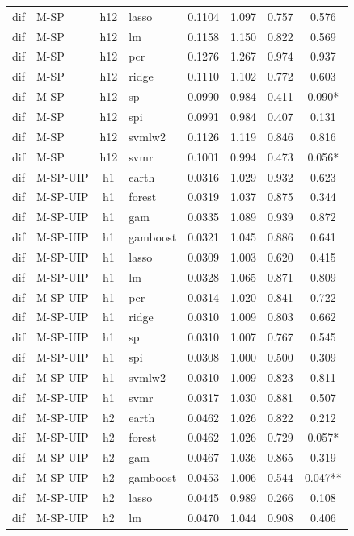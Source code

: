\begin{ThreePartTable}
\begin{longtable}[t]{llclcccc}
dif & M-SP & h12 & lasso & 0.1104 & 1.097 & 0.757 & 0.576\\
dif & M-SP & h12 & lm & 0.1158 & 1.150 & 0.822 & 0.569\\
dif & M-SP & h12 & pcr & 0.1276 & 1.267 & 0.974 & 0.937\\
dif & M-SP & h12 & ridge & 0.1110 & 1.102 & 0.772 & 0.603\\
dif & M-SP & h12 & sp & 0.0990 & 0.984 & 0.411 & 0.090*\\
dif & M-SP & h12 & spi & 0.0991 & 0.984 & 0.407 & 0.131\\
dif & M-SP & h12 & svmlw2 & 0.1126 & 1.119 & 0.846 & 0.816\\
dif & M-SP & h12 & svmr & 0.1001 & 0.994 & 0.473 & 0.056*\\
\addlinespace
dif & M-SP-UIP & h1 & earth & 0.0316 & 1.029 & 0.932 & 0.623\\
dif & M-SP-UIP & h1 & forest & 0.0319 & 1.037 & 0.875 & 0.344\\
dif & M-SP-UIP & h1 & gam & 0.0335 & 1.089 & 0.939 & 0.872\\
dif & M-SP-UIP & h1 & gamboost & 0.0321 & 1.045 & 0.886 & 0.641\\
dif & M-SP-UIP & h1 & lasso & 0.0309 & 1.003 & 0.620 & 0.415\\
dif & M-SP-UIP & h1 & lm & 0.0328 & 1.065 & 0.871 & 0.809\\
dif & M-SP-UIP & h1 & pcr & 0.0314 & 1.020 & 0.841 & 0.722\\
dif & M-SP-UIP & h1 & ridge & 0.0310 & 1.009 & 0.803 & 0.662\\
dif & M-SP-UIP & h1 & sp & 0.0310 & 1.007 & 0.767 & 0.545\\
dif & M-SP-UIP & h1 & spi & 0.0308 & 1.000 & 0.500 & 0.309\\
dif & M-SP-UIP & h1 & svmlw2 & 0.0310 & 1.009 & 0.823 & 0.811\\
dif & M-SP-UIP & h1 & svmr & 0.0317 & 1.030 & 0.881 & 0.507\\
\addlinespace
dif & M-SP-UIP & h2 & earth & 0.0462 & 1.026 & 0.822 & 0.212\\
dif & M-SP-UIP & h2 & forest & 0.0462 & 1.026 & 0.729 & 0.057*\\
dif & M-SP-UIP & h2 & gam & 0.0467 & 1.036 & 0.865 & 0.319\\
dif & M-SP-UIP & h2 & gamboost & 0.0453 & 1.006 & 0.544 & 0.047**\\
dif & M-SP-UIP & h2 & lasso & 0.0445 & 0.989 & 0.266 & 0.108\\
dif & M-SP-UIP & h2 & lm & 0.0470 & 1.044 & 0.908 & 0.406\\

\end{longtable}
\end{ThreePartTable}
